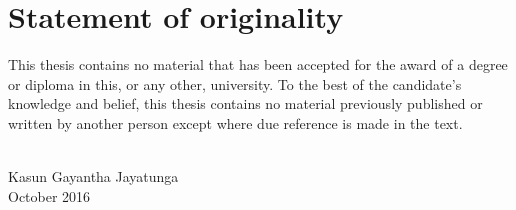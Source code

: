 \chapter*{Statement of originality}

This thesis contains no material that has been accepted for the award of a degree or diploma in this, or any other, university. To the best of the candidate’s knowledge and belief, this thesis contains no material previously published or written by another person except where due reference is made in the text.

\vspace{20mm}

\begin{flushright}
\solidrule\solidrule\solidrule\solidrule\solidrule\\
Kasun Gayantha Jayatunga\\
October 2016
\end{flushright}